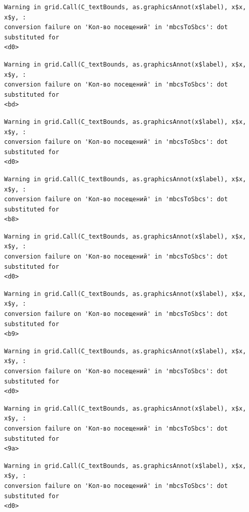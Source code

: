 \documentclass[
  letterpaper,
  DIV=11,
  numbers=noendperiod]{scrartcl}
\begin{document}
\begin{verbatim}
Warning in grid.Call(C_textBounds, as.graphicsAnnot(x$label), x$x, x$y, :
conversion failure on 'Кол-во посещений' in 'mbcsToSbcs': dot substituted for
<d0>
\end{verbatim}

\begin{verbatim}
Warning in grid.Call(C_textBounds, as.graphicsAnnot(x$label), x$x, x$y, :
conversion failure on 'Кол-во посещений' in 'mbcsToSbcs': dot substituted for
<bd>
\end{verbatim}

\begin{verbatim}
Warning in grid.Call(C_textBounds, as.graphicsAnnot(x$label), x$x, x$y, :
conversion failure on 'Кол-во посещений' in 'mbcsToSbcs': dot substituted for
<d0>
\end{verbatim}

\begin{verbatim}
Warning in grid.Call(C_textBounds, as.graphicsAnnot(x$label), x$x, x$y, :
conversion failure on 'Кол-во посещений' in 'mbcsToSbcs': dot substituted for
<b8>
\end{verbatim}

\begin{verbatim}
Warning in grid.Call(C_textBounds, as.graphicsAnnot(x$label), x$x, x$y, :
conversion failure on 'Кол-во посещений' in 'mbcsToSbcs': dot substituted for
<d0>
\end{verbatim}

\begin{verbatim}
Warning in grid.Call(C_textBounds, as.graphicsAnnot(x$label), x$x, x$y, :
conversion failure on 'Кол-во посещений' in 'mbcsToSbcs': dot substituted for
<b9>
\end{verbatim}

\begin{verbatim}
Warning in grid.Call(C_textBounds, as.graphicsAnnot(x$label), x$x, x$y, :
conversion failure on 'Кол-во посещений' in 'mbcsToSbcs': dot substituted for
<d0>
\end{verbatim}

\begin{verbatim}
Warning in grid.Call(C_textBounds, as.graphicsAnnot(x$label), x$x, x$y, :
conversion failure on 'Кол-во посещений' in 'mbcsToSbcs': dot substituted for
<9a>
\end{verbatim}

\begin{verbatim}
Warning in grid.Call(C_textBounds, as.graphicsAnnot(x$label), x$x, x$y, :
conversion failure on 'Кол-во посещений' in 'mbcsToSbcs': dot substituted for
<d0>
\end{verbatim}
\end{document}

